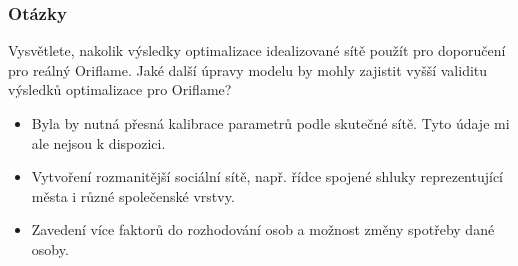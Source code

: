 \documentclass[xcolor=dvipsnames]{beamer}
\begin{document}
  \begin{frame}
    \frametitle{Otázky}
    Vysvětlete, nakolik výsledky optimalizace idealizované sítě použít pro doporučení pro reálný Oriflame. Jaké další úpravy modelu by mohly zajistit vyšší validitu výsledků optimalizace pro Oriflame?\\[1cm]
    \begin{itemize}
    \item Byla by nutná přesná kalibrace parametrů podle skutečné sítě. Tyto údaje mi ale nejsou k dispozici.
    \item Vytvoření rozmanitější sociální sítě, např. řídce spojené shluky reprezentující města i různé společenské vrstvy.
    \item Zavedení více faktorů do rozhodování osob a možnost změny spotřeby dané osoby.
    \end{itemize}
  \end{frame}

      
\end{document}
